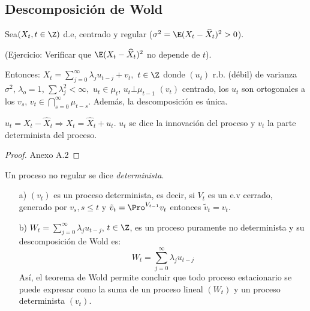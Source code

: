 \subsection{Descomposici\'{o}n de Wold}
\label{subsubsec:mylabel4}

\begin{teorema}
Sea$(X_{t} ,t\in \Z)$ d.e, centrado y regular ($ {\sigma^{2}=\E( {X_{t} -\widehat{{X}}_{t} } )^{2}>0} $).\newline

(Ejercicio: Verificar que $\E( {X_{t} -\widehat{{X}}_{t} } )^{2}$ no depende de $t$).\newline 

Entonces: $\displaystyle X_{t} =\sum_{j=0}^\infty {\lambda_{j} u_{t-j} +v_{t} },$ $t\in \Z$
donde $(u_{t} )$ r.b. (d\'{e}bil) de varianza $\sigma^{2}$, $\lambda_{o} =1$, $\sum {\lambda_{j}^{2} <\infty },$ $u_{t} \in \mu_{t}$, $u_{t} \bot \mu_{t-1}$ $(v_{t})$ centrado, los $u_{t}$ son ortogonales a los $v_{s}$, $\displaystyle v_{t} \in \bigcap_{s=0}^{\infty } \mu_{t-s} $. Adem\'{a}s, la descomposici\'{o}n es \'{u}nica.
\end{teorema}

\begin{observacion}
$u_{t} =X_{t} -\widehat{{X}}_{t} \Rightarrow X_{t} =\widehat{{X}}_{t} +u_{t}.$ $ u_{t} $ se dice la innovaci\'{o}n del proceso y $v_{t}$ la parte determinista del proceso.
\end{observacion}

\begin{proof}
 Anexo A.2
\end{proof}

\begin{definicion}
 Un proceso no regular se dice \emph{determinista}.
\end{definicion}

\begin{ejercicio}
\quad
 \begin{enumerate}
  \item[a)] $(v_{t})$ es un proceso determinista, es decir, si $V_{t}$ es un e.v cerrado, generado por $v_{s}, s\leq t$ y $\tilde{v}_{t}=\Pro^{V_{t-1}} {v}_{t}$ entonces $\tilde{{v}}_{t} =v_{t} $.

  \item[b)] $\displaystyle W_{t} =\sum_{j=0}^\infty \lambda_{j} u_{t-j}$, $t\in\Z$, es un proceso puramente no determinista y su descomposici\'{o}n de Wold es: 
  \[
    W_{t} =\sum_{j=0}^\infty {\lambda_{j} u_{t-j} } 
  \]
	As\'{i}, el teorema de Wold permite concluir que todo proceso estacionario se puede expresar como la suma de un proceso lineal $(W_{t})$ y un proceso determinista $(v_{t})$.
 \end{enumerate}

\end{ejercicio}


